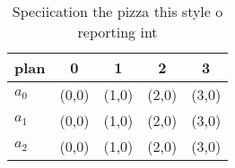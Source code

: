 \documentclass[a4paper]{article}
\begin{document}
\begin{table}
\begin{adjustbox}{width=0.6\columnwidth}
\begin{tabular}{|l|l|l|l|l|}
\hline
\textbf{plan} & \multicolumn{1}{c|}{\textbf{0}} & \multicolumn{1}{c|}{\textbf{1}} & \multicolumn{1}{c|}{\textbf{2}} & \multicolumn{1}{c|}{\textbf{3}} \\ \hline
\textbf{$a_0$}  & (0,0) & (1,0) & (2,0) & (3,0) \\ \hline
\textbf{$a_1$}  & (0,0) & (1,0) & (2,0) & (3,0) \\ \hline
\textbf{$a_2$}  & (0,0) & (1,0) & (2,0) & (3,0) \\ \hline
\end{tabular}
\end{adjustbox}
\caption{Speciication the pizza this style o reporting int
}
\end{table}
\end{document}
